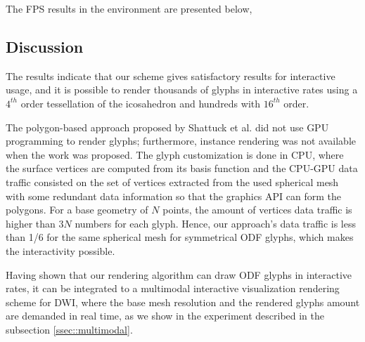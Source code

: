 \documentclass[twoside,twocolumn,10pt]{article}
\begin{document}
The FPS results in the environment are presented below, %


\subsection{Discussion}

The results indicate that our scheme gives satisfactory results for interactive usage, and it is possible to render thousands of glyphs in interactive rates using a $4^{th}$ order tessellation of the icosahedron and hundreds with $16^{th}$ order.



The polygon-based approach proposed by Shattuck et al. \cite{shattuck2008} did not use GPU programming to render glyphs; furthermore, instance rendering was not available when the work was proposed. The glyph customization is done in CPU, where the surface vertices are computed from its basis function and the CPU-GPU data traffic consisted on the set of vertices extracted from the used spherical mesh with some redundant data information so that the graphics API can form the polygons. For a base geometry of $N$ points, the amount of vertices data traffic is higher than $3N$ numbers for each glyph. Hence, our approach's data traffic is less than 1/6 for the same spherical mesh for symmetrical ODF glyphs, which makes the interactivity possible.

Having shown that our rendering algorithm can draw ODF glyphs in interactive rates, it can be integrated to a multimodal interactive visualization rendering scheme for DWI, where the base mesh resolution and the rendered glyphs amount are demanded in real time, as we show in the experiment described in the subsection \ref{ssec::multimodal}.
\end{document}
